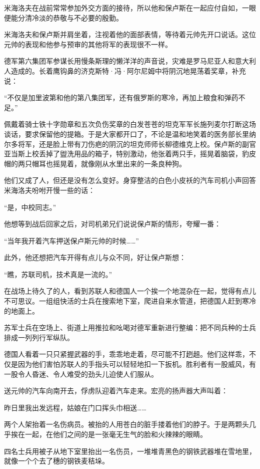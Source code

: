 米海洛夫在战前常常参加外交方面的接待，所以他和保卢斯在一起应付自如，一眼便能分清冷淡的恭敬与不必要的殷勤。

米海洛夫和保卢斯并肩坐着，注视着他的面部表情，等待着元帅先开口说话。这位元帅的表现和他参与预审的其他将军的表现很不一样。

德军第六集团军参谋长用慢条斯理的懒洋洋的声音说，灾难是罗马尼亚人和意大利人造成的。长着鹰钩鼻的济克斯特·冯·阿尔尼姆中将阴沉地晃荡着奖章，补充说：

“不仅是加里波第和他的第八集团军，还有俄罗斯的寒冷，再加上粮食和弹药不足。”

佩戴着骑士铁十字勋章和五次负伤奖章的白发苍苍的坦克军军长施列麦尔打断这场谈话，要求保留他的提箱。于是大家都开口了，不论是温和地笑着的医务部长里纳尔多将军，还是脸上带有刀伤疤的阴沉的坦克师师长柳德维克上校。保卢斯的副官亚当斯上校丢掉了盥洗用品的箱子，特别激动，他张着两只手，摇晃着脑袋，豹皮帽的两只帽耳也摇晃着，就像刚从水里出来的一条良种狗。

他们又成了人，但还是没有怎么变好。身穿整洁的白色小皮袄的汽车司机小声回答米海洛夫吩咐开慢一些的话：

“是，中校同志。”

他想等到战后回家之后，对司机弟兄们说说保卢斯的情形，夸耀一番：

“当年我开着汽车押送保卢斯元帅的时候……”

此外，他还想把汽车开得有点儿与众不同，好让保卢斯想：

“瞧，苏联司机，技术真是一流的。”

在战场上待久了的人，看到苏联人和德国人一个挨一个地混杂在一起，觉得有点儿不可思议。一组组快活的士兵在搜索地下室，爬进自来水管道，把德国人赶到寒冷的地面上。

苏军士兵在空场上、街道上用推拉和吆喝对德军重新进行整编：把不同兵种的士兵排成一列列行军纵队。

德国人看着一只只紧握武器的手，乖乖地走着，尽可能不打趔趄。他们这样乖，不仅是因为他们害怕苏联人的手指头可以轻轻地扣一下扳机。胜利者有一股威风，有一股令人昏迷、令人难受的劲头儿迫使人们服从。

送元帅的汽车向南开去，俘虏队迎着汽车走来。宏亮的扬声器大声叫着：

昨日里我出发远程，姑娘在门口挥头巾相送……

两个人架抬着一名伤病员。被抬的人用苍白的脏手搂着他们的脖子。于是两颗头几乎挨在一起，在他们之间的是一张毫无生气的脸和火辣辣的眼睛。

四名士兵用被子从地下室里抬出一名伤员，一堆堆青黑色的钢铁武器堆在雪地里，就像一个个去了穗的钢铁麦秸垛。

